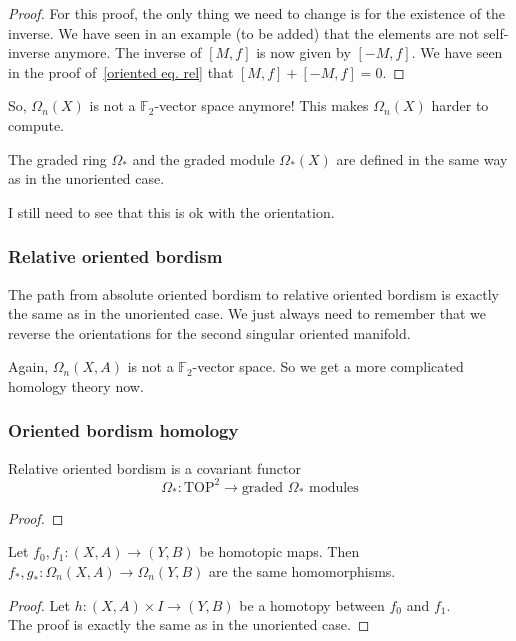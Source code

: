 \documentclass[a4paper,11pt]{article}
\begin{document}
\begin{proof}
    For this proof, the only thing we need to change is for the existence of the inverse. We have seen in an example (to be added) that the elements are not self-inverse anymore. The inverse of \([M,f]\) is now given by \([-M,f]\). We have seen in the proof of\ \ref{oriented eq. rel} that \([M,f]+[-M,f]=0\).
\end{proof}

So, \(\Omega_n(X)\) is not a \(\mathbb{F}_2\)-vector space anymore! This makes \(\Omega_n(X)\) harder to compute.

The graded ring \(\Omega_\ast\) and the graded module \(\Omega_\ast(X)\) are defined in the same way as in the unoriented case.

I still need to see that this is ok with the orientation.

\subsubsection{Relative oriented bordism}

The path from absolute oriented bordism to relative oriented bordism is exactly the same as in the unoriented case. We just always need to remember that we reverse the orientations for the second singular oriented manifold.

Again, \(\Omega_n(X,A)\) is not a \(\mathbb{F}_2\)-vector space. So we get a more complicated homology theory now.

\subsubsection{Oriented bordism homology}

\begin{lemma}
    Relative oriented bordism is a covariant functor
    \[\Omega_\ast:\mathrm{TOP}^2\to\text{graded }\Omega_\ast\text{ modules}\]
\end{lemma}

\begin{proof}
    
\end{proof}

\begin{lemma}
    Let \(f_0,f_1:(X,A)\to(Y,B)\) be homotopic maps. Then \(f_\ast,g_\ast:\Omega_n(X,A)\to\Omega_n(Y,B)\) are the same homomorphisms.
\end{lemma}

\begin{proof}\cite{atiyah}
    Let \(h:(X,A)\times I\to (Y,B)\) be a homotopy between \(f_0\) and \(f_1\).\\
    The proof is exactly the same as in the unoriented case.
\end{proof}
\end{document}
